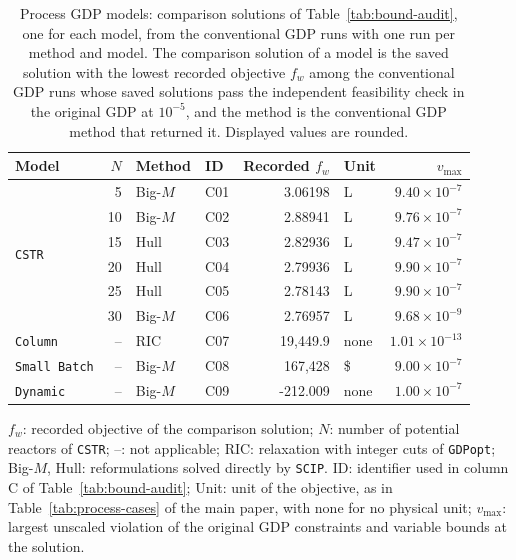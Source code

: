 \FloatBarrier %
\begingroup
\begin{table}[htbp]
\centering
\caption{Process GDP models: comparison solutions of Table~\ref{tab:bound-audit}, one for each model, from the conventional GDP runs with one run per method and model.
The comparison solution of a model is the saved solution with the lowest recorded objective \(f_w\) among the conventional GDP runs whose saved solutions pass the independent feasibility check in the original GDP at \(10^{-5}\), and the method is the conventional GDP method that returned it.
Displayed values are rounded.}
\label{tab:witnesses}
\footnotesize
\begin{threeparttable}
\begin{tabular}{@{}lrllrlr@{}}\toprule
Model & \(N\) & Method & ID & Recorded \(f_w\) & Unit & \(v_{\max}\)\\\midrule
\multirow{6}{*}{\texttt{CSTR}} & 5 & Big-\(M\) & C01 & 3.06198 & L & \(9.40\times10^{-7}\) \\
 & 10 & Big-\(M\) & C02 & 2.88941 & L & \(9.76\times10^{-7}\) \\
 & 15 & Hull & C03 & 2.82936 & L & \(9.47\times10^{-7}\) \\
 & 20 & Hull & C04 & 2.79936 & L & \(9.90\times10^{-7}\) \\
 & 25 & Hull & C05 & 2.78143 & L & \(9.90\times10^{-7}\) \\
 & 30 & Big-\(M\) & C06 & 2.76957 & L & \(9.68\times10^{-9}\) \\
\midrule
\texttt{Column} & -- & RIC & C07 & 19{,}449.9 & none & \(1.01\times10^{-13}\) \\
\midrule
\texttt{Small Batch} & -- & Big-\(M\) & C08 & 167{,}428 & \$ & \(9.00\times10^{-7}\) \\
\midrule
\texttt{Dynamic} & -- & Big-\(M\) & C09 & -212.009 & none & \(1.00\times10^{-7}\) \\
\bottomrule
\end{tabular}
\begin{tablenotes}[flushleft]\footnotesize
\item \(f_w\): recorded objective of the comparison solution; \(N\): number of potential reactors of \texttt{CSTR}; --: not applicable; RIC: relaxation with integer cuts of \texttt{GDPopt}; Big-\(M\), Hull: reformulations solved directly by \texttt{SCIP}.
ID: identifier used in column C of Table~\ref{tab:bound-audit}; Unit: unit of the objective, as in Table~\ifdefined\manuscriptwithsupplement\ref{tab:process-cases}\fi{} of the main paper, with none for no physical unit; \(v_{\max}\): largest unscaled violation of the original GDP constraints and variable bounds at the solution.
\end{tablenotes}
\end{threeparttable}
\end{table}

